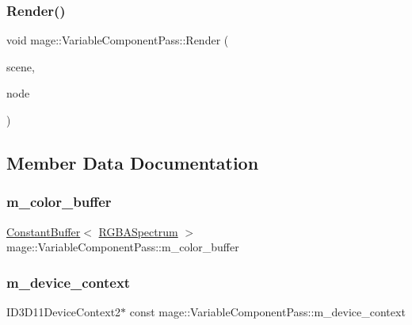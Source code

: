 \subsubsection{\texorpdfstring{Render()}{Render()}}
{\footnotesize\ttfamily void mage\+::\+Variable\+Component\+Pass\+::\+Render (\begin{DoxyParamCaption}\item[{const \hyperlink{structmage_1_1_pass_buffer}{Pass\+Buffer} $\ast$}]{scene,  }\item[{const \hyperlink{classmage_1_1_camera_node}{Camera\+Node} $\ast$}]{node }\end{DoxyParamCaption})}



\subsection{Member Data Documentation}
\hypertarget{classmage_1_1_variable_component_pass_a5ad5ee6588063683cacf4ad3aac055bc}{}\label{classmage_1_1_variable_component_pass_a5ad5ee6588063683cacf4ad3aac055bc} 
\subsubsection{\texorpdfstring{m\+\_\+color\+\_\+buffer}{m\_color\_buffer}}
{\footnotesize\ttfamily \hyperlink{structmage_1_1_constant_buffer}{Constant\+Buffer}$<$ \hyperlink{structmage_1_1_r_g_b_a_spectrum}{R\+G\+B\+A\+Spectrum} $>$ mage\+::\+Variable\+Component\+Pass\+::m\+\_\+color\+\_\+buffer\hspace{0.3cm}{\ttfamily [private]}}

\hypertarget{classmage_1_1_variable_component_pass_a12a0f59a371c46377af9032744a6e71b}{}\label{classmage_1_1_variable_component_pass_a12a0f59a371c46377af9032744a6e71b} 
\subsubsection{\texorpdfstring{m\+\_\+device\+\_\+context}{m\_device\_context}}
{\footnotesize\ttfamily I\+D3\+D11\+Device\+Context2$\ast$ const mage\+::\+Variable\+Component\+Pass\+::m\+\_\+device\+\_\+context\hspace{0.3cm}{\ttfamily [private]}}

